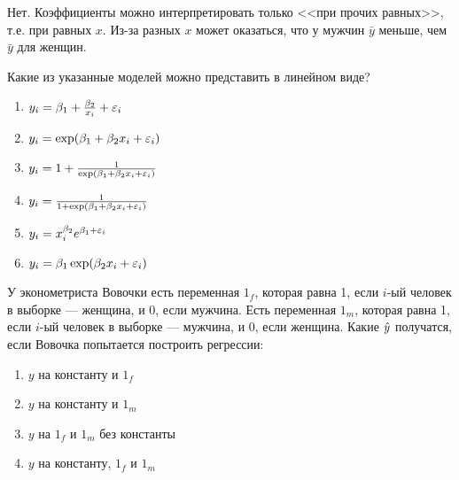 \documentclass[pdftex,11pt,openany]{book}\usepackage[]{graphicx}\usepackage[]{color}
\begin{document}
\begin{solution}
Нет. Коэффициенты можно интерпретировать только <<при прочих равных>>, т.е. при равных $x$. Из-за разных $x$ может оказаться, что у мужчин $\bar{y}$ меньше, чем $\bar{y}$ для женщин.
\end{solution}



\begin{problem}
 Какие из указанные моделей можно представить в линейном виде?
\begin{enumerate}
\item $y_i=\beta_1+\frac{\beta_2}{x_i}+\varepsilon_i$
\item $y_i=\exp(\beta_1+\beta_2 x_i+\varepsilon_i)$
\item $y_i=1+\frac{1}{\exp(\beta_1+\beta_2 x_i+\varepsilon_i)}$
\item $y_i=\frac{1}{1+\exp(\beta_1+\beta_2 x_i+\varepsilon_i)}$
\item $y_i=x_i^{\beta_2}e^{\beta_1+\varepsilon_i}$
\item $y_i=\beta_1\exp(\beta_2 x_i + \varepsilon_i)$
\end{enumerate}
\end{problem}

\begin{solution}
\newpage
\end{solution}



\begin{problem}
 У эконометриста Вовочки есть переменная $1_f$, которая равна 1, если $i$-ый человек в выборке --- женщина, и 0, если мужчина. Есть переменная $1_m$, которая равна 1, если $i$-ый человек в выборке --- мужчина, и 0, если женщина. Какие $\hat{y}$ получатся, если Вовочка попытается построить регрессии:
\begin{enumerate}
\item $y$ на константу и $1_f$
\item $y$ на константу и $1_m$
\item $y$ на $1_f$ и $1_m$ без константы
\item $y$ на константу, $1_f$ и $1_m$
\end{enumerate}
\end{problem}

\begin{solution}
\end{solution}
 
\end{document}
